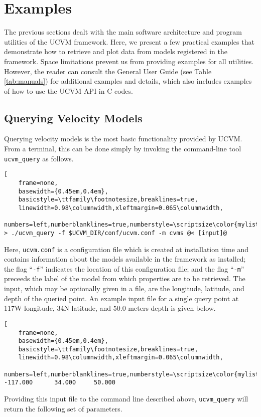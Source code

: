 
\section{Examples}

The previous sections dealt with the main software architecture and program utilities of the UCVM framework. Here, we present a few practical examples that demonstrate how to retrieve and plot data from models registered in the framework. Space limitations prevent us from providing examples for all utilities. However, the reader can consult the General User Guide (see Table \ref{tab:manuals}) for additional examples and details, which also includes examples of how to use the UCVM API in C codes.

\subsection{Querying Velocity Models}

Querying velocity models is the most basic functionality provided by UCVM. From a terminal, this can be done simply by invoking the command-line tool \texttt{ucvm\_query} as follows.

\begin{lstlisting}[
	frame=none,
	basewidth={0.45em,0.4em},
	basicstyle=\ttfamily\footnotesize,breaklines=true,
	linewidth=0.98\columnwidth,xleftmargin=0.065\columnwidth,
	numbers=left,numberblanklines=true,numberstyle=\scriptsize\color{mylistingnclr},style=optional]
> ./ucvm_query -f $UCVM_DIR/conf/ucvm.conf -m cvms @< [input]@
\end{lstlisting}

\noindent
Here, \texttt{ucvm.conf} is a configuration file which is created at installation time and contains information about the models available in the framework as installed; the flag ``\texttt{-f}'' indicates the location of this configuration file; and the flag ``\texttt{-m}'' preceeds the label of the model from which properties are to be retrieved. The input, which may be optionally given in a file, are the longitude, latitude, and depth of the queried point. An example input file for a single query point at 117\textdegree{}W longitude, 34\textdegree{}N latitude, and 50.0 meters depth is given below.

\begin{lstlisting}[
	frame=none,
	basewidth={0.45em,0.4em},
	basicstyle=\ttfamily\footnotesize,breaklines=true,
	linewidth=0.98\columnwidth,xleftmargin=0.065\columnwidth,
	numbers=left,numberblanklines=true,numberstyle=\scriptsize\color{mylistingnclr}]
-117.000      34.000     50.000
\end{lstlisting}
Providing this input file to the command line described above, \texttt{ucvm\_query} will return the following set of parameters.

